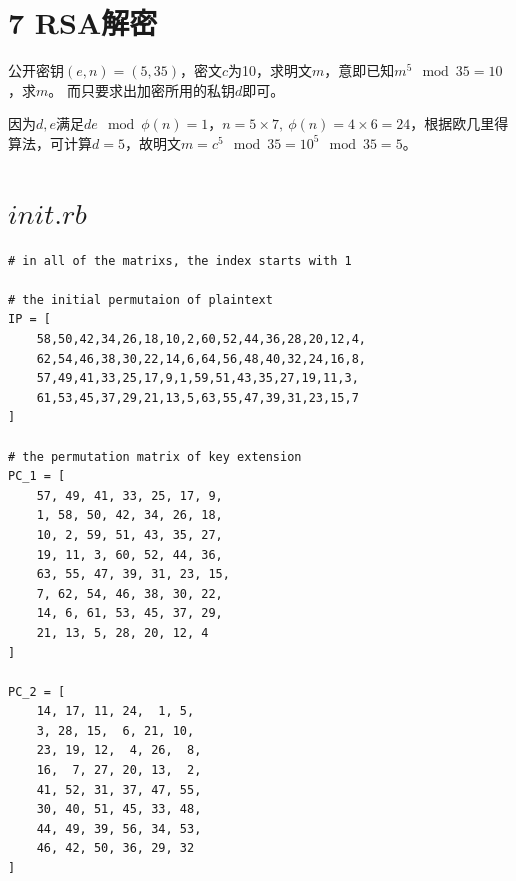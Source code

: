 \documentclass[10pt,a4paper]{article}
\begin{document}
\section*{7 RSA解密}
公开密钥$(e,n)=(5, 35)$，密文$c$为10，求明文$m$，意即已知$m^5 \mod 35 = 10$，求$m$。
而只要求出加密所用的私钥$d$即可。

因为$d,e$满足$de \mod \phi(n) = 1$，$n=5\times7,\ \phi(n) = 4\times6 = 24$，根据欧几里得算法，可计算$d=5$，故明文$m=c^5\mod 35 = 10^5 \mod 35 = 5$。

\appendix
 \section{$init.rb$}
\begin{verbatim}
# in all of the matrixs, the index starts with 1

# the initial permutaion of plaintext
IP = [
    58,50,42,34,26,18,10,2,60,52,44,36,28,20,12,4,
    62,54,46,38,30,22,14,6,64,56,48,40,32,24,16,8,
    57,49,41,33,25,17,9,1,59,51,43,35,27,19,11,3,
    61,53,45,37,29,21,13,5,63,55,47,39,31,23,15,7
]

# the permutation matrix of key extension
PC_1 = [
    57, 49, 41, 33, 25, 17, 9,
    1, 58, 50, 42, 34, 26, 18,
    10, 2, 59, 51, 43, 35, 27,
    19, 11, 3, 60, 52, 44, 36,
    63, 55, 47, 39, 31, 23, 15,
    7, 62, 54, 46, 38, 30, 22,
    14, 6, 61, 53, 45, 37, 29,
    21, 13, 5, 28, 20, 12, 4
]

PC_2 = [
    14, 17, 11, 24,  1, 5,
    3, 28, 15,  6, 21, 10,
    23, 19, 12,  4, 26,  8,
    16,  7, 27, 20, 13,  2,
    41, 52, 31, 37, 47, 55,
    30, 40, 51, 45, 33, 48,
    44, 49, 39, 56, 34, 53,
    46, 42, 50, 36, 29, 32
]


\end{verbatim}
\end{document}
